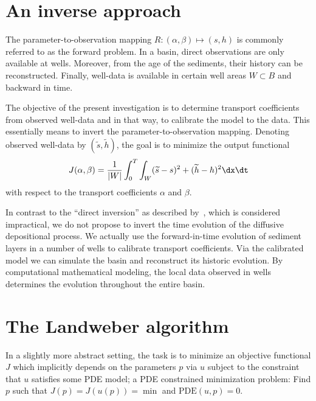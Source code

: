 \section{An inverse approach}

The parameter-to-observation mapping $R: (\alpha, \beta) \mapsto (s,
h)$ is commonly referred to as the forward problem.  In a basin, direct
observations are only available at wells. Moreover, from the age of
the sediments, their history can be reconstructed.  Finally, well-data
is available in certain well areas $W \subset B$ and backward in time.

The objective of the present investigation is to determine transport
coefficients from observed well-data and in that way, to calibrate the
model to the data. This essentially means to invert the
parameter-to-observation mapping. Denoting observed well-data by
$(\widetilde s,\widetilde h)$, the goal is to minimize the output
functional
\begin{equation} \label{eq:schroll:output}
 J(\alpha, \beta) =
 \frac{1}{|W|} \int_0^T \int_W (\widetilde s - s)^2 + (\widetilde h - h)^2  \dx \dt
\end{equation}
with respect to the transport coefficients $\alpha$ and $\beta$.

In contrast to the ``direct inversion'' as described
by~\citet{ImhofSharma2007}, which is considered impractical, we do not
propose to invert the time evolution of the diffusive depositional
process.  We actually use the forward-in-time evolution of sediment
layers in a number of wells to calibrate transport coefficients.  Via
the calibrated model we can simulate the basin and reconstruct its
historic evolution. By computational mathematical modeling, the local
data observed in wells determines the evolution throughout the entire
basin.

\section{The Landweber algorithm}

In a slightly more abstract setting, the task is to minimize an
objective functional $J$ which implicitly depends on the parameters
$p$ via $u$ subject to the constraint that $u$ satisfies some PDE
model; a PDE constrained minimization problem: Find $p$ such that
$J(p)=J(u(p))=\min$ and $\mathrm{PDE}(u,p)=0$.

